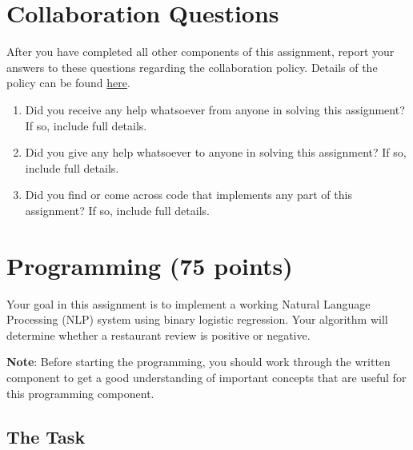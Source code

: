 \documentclass[11pt,addpoints,answers]{exam}
\begin{document}
\begin{questions}
\begin{parts}
\begin{your_solution}[height=8cm]
\end{your_solution}

\end{parts}\newpage
\newpage
\section{Collaboration Questions}
After you have completed all other components of this assignment, report your answers to these questions regarding the collaboration policy. Details of the policy can be found \href{http://www.cs.cmu.edu/~mgormley/courses/10601/syllabus.html}{here}.
\begin{enumerate}
    \item Did you receive any help whatsoever from anyone in solving this assignment? If so, include full details.
    \item Did you give any help whatsoever to anyone in solving this assignment? If so, include full details.
    \item Did you find or come across code that implements any part of this assignment? If so, include full details.
\end{enumerate}

\begin{your_solution}[height=6cm]

\end{your_solution}
\newpage
\end{questions}

\section{Programming (75 points)}

Your goal in this assignment is to implement a working Natural Language Processing (NLP) system using binary logistic regression. Your algorithm will determine whether a restaurant review is positive or negative.

\textbf{Note}: Before starting the programming, you should work through the written component to get a good understanding of important concepts that are useful for this programming component.



\subsection{The Task}\label{task}
\end{document}
